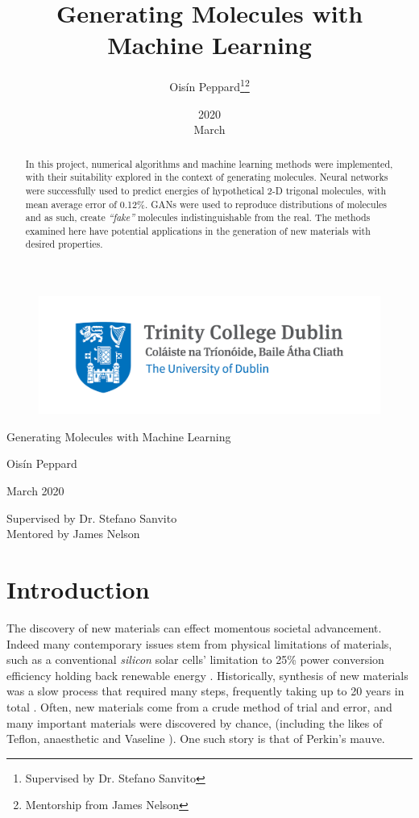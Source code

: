\documentclass[12pt,a4paper]{article}
\title{Generating Molecules with Machine Learning}
\date{2020\\ March}
\author{Oisín Peppard\thanks{Supervised by Dr. Stefano Sanvito}\thanks{Mentorship from James Nelson}}
\newcommand{\Title}[1]{\begin{center}\textcolor{blu2}{\begin{Huge}#1\vspace{12pt}\end{Huge}}\end{center}}
\newcommand{\SubTitle}[1]{\begin{center}\textcolor{blu2}{#1\vspace{20pt}}\end{center}}
\begin{document}
\begin{figure}
    \centering
    \includegraphics[width = 0.75\linewidth]{images/logo.jpg}
\end{figure}

\vspace{5cm}
\Title{Generating Molecules with Machine Learning}
\SubTitle{Oisín Peppard}
\SubTitle{March 2020}
\SubTitle{Supervised  by Dr. Stefano Sanvito \\ Mentored by James Nelson}
\begin{abstract}
\noindent
\centering
In this project, numerical algorithms and machine learning methods were implemented, with their suitability explored in the context of generating molecules. Neural networks were successfully used to predict energies of hypothetical 2-D trigonal molecules, with mean average error of 0.12\%. GANs were used to reproduce distributions of molecules and as such, create \emph{\enquote{fake}} molecules indistinguishable from the real. The methods examined here have potential applications in the generation of new materials with desired properties.
\end{abstract}
\pagebreak
\linespread{0.9}{%
\small{\tableofcontents}}
\linespread{1.3}%
\pagebreak
\section{Introduction}
The discovery of new materials can effect momentous societal advancement. Indeed many contemporary issues stem from physical limitations of materials, such as a conventional \emph{silicon} solar cells' limitation to 25\% power conversion efficiency holding back renewable energy \cite{green_corrigendum_2017}. Historically, synthesis of new materials was a slow process that required many steps, frequently taking up to 20 years in total \cite{maine_commercializing_2006}. Often, new materials come from a crude method of trial and error, and many important materials were discovered by chance, (including the likes of Teflon, anaesthetic and Vaseline \cite{sanchez-lengeling_inverse_2018}). One such story is that of Perkin’s mauve.
\end{document}
